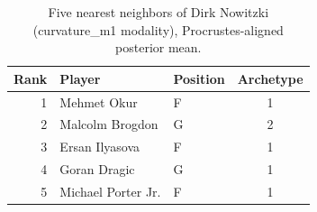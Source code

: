 \begin{table}[htbp]
  \centering\small
  \begin{tabular}{rllc}
    \toprule
    Rank & Player & Position & Archetype \\
    \midrule
    1 & Mehmet Okur & F & 1 \\
    2 & Malcolm Brogdon & G & 2 \\
    3 & Ersan Ilyasova & F & 1 \\
    4 & Goran Dragic & G & 1 \\
    5 & Michael Porter Jr. & F & 1 \\
    \bottomrule
  \end{tabular}
  \caption{Five nearest neighbors of Dirk Nowitzki (curvature_m1 modality), Procrustes-aligned posterior mean.}
  \label{tab:Dirk_Nowitzki_neighbors_curvature_m1}
\end{table}


